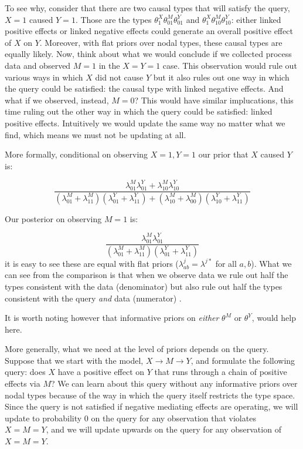 \documentclass[
  12pt,
]{book}
\begin{document}
To see why, consider that there are two causal types that will satisfy the query, \(X=1\) caused \(Y=1\). Those are the types \(\theta^X_1 \theta^M_{01} \theta^Y_{01}\) and \(\theta^X_1 \theta^M_{10} \theta^Y_{10}\): either linked positive effects or linked negative effects could generate an overall positive effect of \(X\) on \(Y\). Moreover, with flat priors over nodal types, these causal types are equally likely. Now, think about what we would conclude if we collected process data and observed \(M=1\) in the \(X=Y=1\) case. This observation would rule out various ways in which \(X\) did not cause \(Y\) but it also rules out one way in which the query could be satisfied: the causal type with linked negative effects. And what if we observed, instead, \(M=0\)? This would have similar implucations, this time ruling out the other way in which the query could be satisfied: linked positive effects. Intuitively we would update the same way no matter what we find, which means we must not be updating at all.

More formally, conditional on observing \(X=1, Y=1\) our prior that \(X\) caused \(Y\) is:

\[\frac{\lambda^M_{01}\lambda^Y_{01}+ \lambda^M_{10}\lambda^Y_{10}}{(\lambda^M_{01}+\lambda^M_{11})(\lambda^Y_{01}+ \lambda^Y_{11})+ (\lambda^M_{10}+\lambda^M_{00})(\lambda^Y_{10}+ \lambda^Y_{11}) }\]

Our posterior on observing \(M=1\) is:

\[\frac{\lambda^M_{01}\lambda^Y_{01}}{(\lambda^M_{01}+\lambda^M_{11})(\lambda^Y_{01} + \lambda^Y_{11})}\]
it is easy to see these are equal with flat priors (\(\lambda^j_{ab}=\lambda^{j*}\) for all \(a,b\)). What we can see from the comparison is that when we observe data we rule out half the types consistent with the data (denominator) but also rule out half the types consistent with the query \emph{and} data (numerator) .

It is worth noting however that informative priors on \emph{either} \(\theta^M\) or \(\theta^Y\), would help here.

More generally, what we need at the level of priors depends on the query. Suppose that we start with the model, \(X \rightarrow M \rightarrow Y\), and formulate the following query: does \(X\) have a positive effect on \(Y\) that runs through a chain of positive effects via \(M\)? We can learn about this query without any informative priors over nodal types because of the way in which the query itself restricts the type space. Since the query is not satisfied if negative mediating effects are operating, we will update to probability 0 on the query for any observation that violates \(X=M=Y\), and we will update upwards on the query for any observation of \(X=M=Y\).
\end{document}
